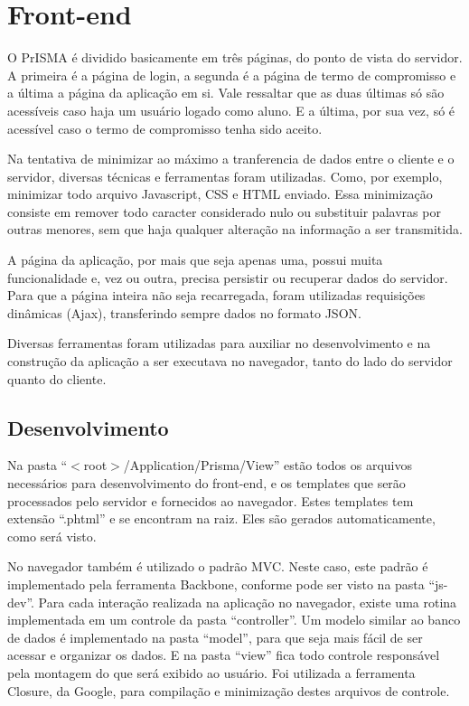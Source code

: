\documentclass[graduacao,brazil]{ThesisPUC}
\begin{document}
\section{Front-end}

O PrISMA é dividido basicamente em três páginas, do ponto de vista do servidor. A primeira é a página de login, a segunda é a página de termo de compromisso e a última a página da aplicação em si. Vale ressaltar que as duas últimas só são acessíveis caso haja um usuário logado como aluno. E a última, por sua vez, só é acessível caso o termo de compromisso tenha sido aceito.

Na tentativa de minimizar ao máximo a tranferencia de dados entre o cliente e o servidor, diversas técnicas e ferramentas foram utilizadas. Como, por exemplo, minimizar todo arquivo Javascript, CSS e HTML enviado. Essa minimização consiste em remover todo caracter considerado nulo ou substituir palavras por outras menores, sem que haja qualquer alteração na informação a ser transmitida.

A página da aplicação, por mais que seja apenas uma, possui muita funcionalidade e, vez ou outra, precisa persistir ou recuperar dados do servidor. Para que a página inteira não seja recarregada, foram utilizadas requisições dinâmicas (Ajax), transferindo sempre dados no formato JSON.

Diversas ferramentas foram utilizadas para auxiliar no desenvolvimento e na construção da aplicação a ser executava no navegador, tanto do lado do servidor quanto do cliente.

\subsection{Desenvolvimento}

Na pasta “$<$root$>$/Application/Prisma/View” estão todos os arquivos necessários para desenvolvimento do front-end, e os templates que serão processados pelo servidor e fornecidos ao navegador. Estes templates tem extensão “.phtml” e se encontram na raiz. Eles são gerados automaticamente, como será visto.

No navegador também é utilizado o padrão MVC. Neste caso, este padrão é implementado pela ferramenta Backbone\cite{Backbone}, conforme pode ser visto na pasta “js-dev”. Para cada interação realizada na aplicação no navegador, existe uma rotina implementada em um controle da pasta “controller”. Um modelo similar ao banco de dados é implementado na pasta “model”, para que seja mais fácil de ser acessar e organizar os dados. E na pasta “view” fica todo controle responsável pela montagem do que será exibido ao usuário. Foi utilizada a ferramenta Closure\cite{Closure}, da Google, para compilação e minimização destes arquivos de controle.
\end{document}
